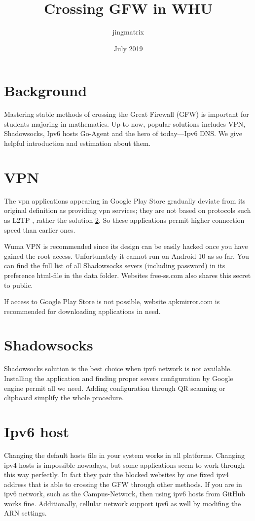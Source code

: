 \documentclass{ctexart}
\title{Crossing GFW in WHU}
\author{jingmatrix }
\date{July 2019}
\begin{document}
\maketitle
\tableofcontents
\section*{Background}
Mastering stable methods of crossing the Great Firewall (GFW) is important for students majoring in mathematics. Up to now, popular solutions includes VPN, Shadowsocks, Ipv6 hosts Go-Agent and the hero of today---Ipv6 DNS. We give helpful introduction and estimation about them.
\section{VPN}\label{method:vpn}
The vpn applications appearing in Google Play Store gradually deviate from its original definition as providing vpn services; they are not based on protocols such as L2TP , rather the solution \ref{method:ss}. So these applications permit  higher connection speed than earlier ones.

Wuma VPN is recommended since its design can be easily hacked once you have gained the root access. Unfortunately it cannot run on Android 10 as so far.  You can find the full list of all Shadowsocks severs (including password) in its preference html-file in the data folder. Websites free-ss.com also shares this secret to public.

If access to  Google Play Store is not possible, website apkmirror.com is recommended for downloading applications in need.
\section{Shadowsocks}\label{method:ss}
Shadowsocks solution is the best choice when ipv6 network is not available. Installing the application and finding proper severs configuration by Google engine permit all we need. Adding configuration through QR scanning or clipboard simplify the whole procedure.
\section{Ipv6 host}\label{method:host}
Changing the default hosts file in your system works in all platforms.  Changing ipv4 hosts is impossible nowadays, but some applications seem  to work through this way perfectly. In fact they pair the blocked websites by one fixed ipv4 address that is able to crossing the GFW through other methods. If you are in ipv6 network, such as the Campus-Network, then using ipv6 hosts from GitHub works fine. Additionally, cellular network support ipv6 as well by modifing the ARN settings.
\end{document}
